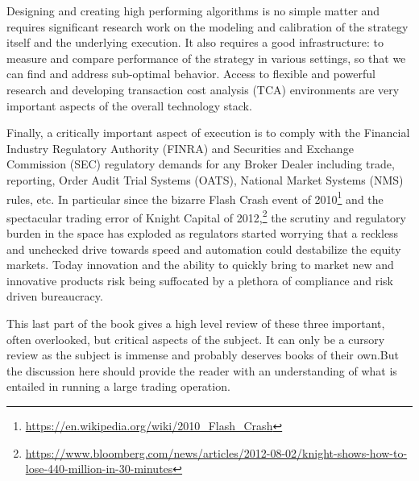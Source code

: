 Designing and creating high performing algorithms is no simple matter and requires significant research work on the modeling and calibration of the strategy itself and the underlying execution. It also requires a good infrastructure: to measure and compare performance of the strategy in various settings, so that we can find and address sub-optimal behavior. Access to flexible and powerful research and developing transaction cost analysis (TCA) environments are very important aspects of the overall technology stack.

Finally, a critically important aspect of execution is to comply with the Financial Industry Regulatory Authority (FINRA) and Securities and Exchange Commission (SEC) regulatory demands for any Broker Dealer including trade, reporting, Order Audit Trial Systems (OATS), National Market Systems (NMS) rules, etc. In particular since the bizarre Flash Crash event of 2010\footnote{\url{https://en.wikipedia.org/wiki/2010_Flash_Crash}} and the spectacular trading error of Knight Capital of 2012,\footnote{\url{https://www.bloomberg.com/news/articles/2012-08-02/knight-shows-how-to-lose-440-million-in-30-minutes}} the scrutiny and regulatory burden in the space has exploded as regulators started worrying that a reckless and unchecked drive towards speed and automation could destabilize the equity markets. Today innovation and the ability to quickly bring to market new and innovative products risk being suffocated by a plethora of compliance and risk driven bureaucracy. 

This last part of the book gives a high level review of these three important, often overlooked, but critical aspects of the subject. It can only be a cursory review as the subject is immense and probably deserves books of their own.But the discussion here should provide the reader with an understanding of what is entailed in running a large trading operation.